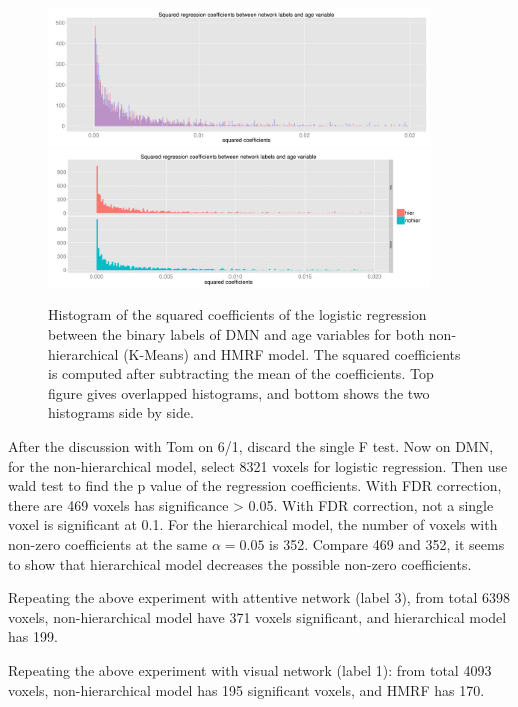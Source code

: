 \documentclass[12pt]{article}
\begin{document}
\begin{figure}[htb]
  \centering
  \includegraphics[width = 0.9\textwidth]{figures/coe2_hist_dmn} \\
  \includegraphics[width = 0.9\textwidth]{figures/coe2_hist2_dmn}
  \caption{ Histogram of the squared coefficients of the logistic regression
    between the binary labels of DMN and \textsf{age} variables for both
    non-hierarchical (K-Means) and HMRF model. The squared coefficients is
    computed after subtracting the mean of the coefficients. Top figure gives
    overlapped histograms, and bottom shows the two histograms side by side.}
  \label{fig:coe2_hist_dmn}
\end{figure}

After the discussion with Tom on 6/1, discard the single F test. Now on DMN, for
the non-hierarchical model, select 8321 voxels for logistic regression. Then use
wald test to find the p value of the regression coefficients. With FDR
correction, there are 469 voxels has significance > 0.05. With FDR correction,
not a single voxel is significant at 0.1. For the hierarchical model, the number
of voxels with non-zero coefficients at the same $\alpha = 0.05$ is 352. Compare
469 and 352, it seems to show that hierarchical model decreases the possible
non-zero coefficients.

Repeating the above experiment with attentive network (label 3), from total 6398
voxels, non-hierarchical model have 371 voxels significant, and hierarchical
model has 199.

Repeating the above experiment with visual network (label 1): from total 4093
voxels, non-hierarchical model has 195 significant voxels, and HMRF has 170.
\end{document}
